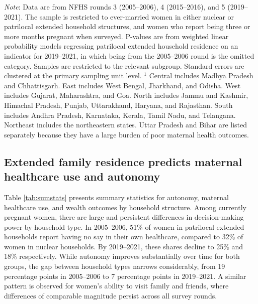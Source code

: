 \documentclass[10pt,twoside,reqno]{article}
\begin{document}
\begin{table}[H]
\caption{: Proportion of pregnant women in patrilocal extended households is increasing among nearly all subgroups}
\label{tab:patrilocal_subgroups}
\vspace{-4pt}

\begin{scriptsize}
\setlength{\tabcolsep}{6pt}
\renewcommand{\arraystretch}{1.2}

\makebox[\linewidth][c]{%
}

\end{scriptsize}

\vspace{1ex}
\small\scriptsize{\textsf{\textit{Note}: Data are from NFHS rounds 3 (2005--2006), 4 (2015--2016), and 5 (2019--2021).}} 
\small\scriptsize{\textsf{The sample is restricted to ever-married women in either nuclear or patrilocal extended household structures, and women who report being three or more months pregnant when surveyed.}}
\newline
\small\scriptsize{\textsf{P-values are from weighted linear probability models regressing patrilocal extended household residence on an indicator for 2019--2021, in which being from the 2005--2006 round is the omitted category. Samples are restricted to the relevant subgroup. Standard errors are clustered at the primary sampling unit level.}}
\newline
\small\scriptsize{\textsf{$^1$ Central includes Madhya Pradesh and Chhattisgarh. East includes West Bengal, Jharkhand, and Odisha. West includes Gujarat, Maharashtra, and Goa. North includes Jammu and Kashmir, Himachal Pradesh, Punjab, Uttarakhand, Haryana, and Rajasthan. South includes Andhra Pradesh, Karnataka, Kerala, Tamil Nadu, and Telangana. Northeast includes the northeastern states. Uttar Pradesh and Bihar are listed separately because they have a large burden of poor maternal health outcomes.}}
\end{table}

\subsection*{Extended family residence predicts maternal healthcare use and autonomy}

Table \ref{tab:sumstats} presents summary statistics for autonomy, maternal healthcare use, and wealth outcomes by household structure. Among currently pregnant women, there are large and persistent differences in decision-making power by household type. In 2005–2006, 51\% of women in patrilocal extended households report having no say in their own healthcare, compared to 32\% of women in nuclear households. By 2019–2021, these shares decline to 25\% and 18\% respectively. While autonomy improves substantially over time for both groups, the gap between household types narrows considerably, from 19 percentage points in 2005–2006 to 7 percentage points in 2019–2021. A similar pattern is observed for women’s ability to visit family and friends, where differences of comparable magnitude persist across all survey rounds.
\end{document}
